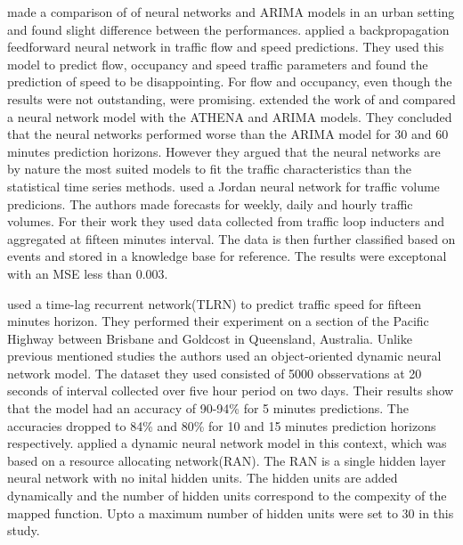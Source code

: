 \citet{clark1993use} made a comparison of of neural networks and ARIMA models in an urban setting
and found slight difference between the performances. \citet{dougherty1997short} applied a
backpropagation feedforward neural network in traffic flow and speed predictions. They used this
model to predict flow, occupancy and speed traffic parameters and found the prediction of speed to
be disappointing. For flow and occupancy, even though the results were not outstanding, were promising.
\citet{kirby1997should} extended the work of \citet{clark1993use} and compared a neural network model
with the ATHENA and ARIMA models. They concluded that the neural networks performed worse than the
ARIMA model for 30 and 60 minutes prediction horizons. However they argued that the neural networks
are by nature the most suited models to fit the traffic characteristics than the statistical time
series methods. \citet{yasdi1999prediction} used a Jordan neural network for traffic volume predicions.
The authors made forecasts for weekly, daily and hourly traffic volumes. For their work they used
data collected from traffic loop inducters and aggregated at fifteen minutes interval. The data is
then further classified based on events and stored in a knowledge base for reference. The results were
exceptonal with an MSE less than 0.003.

\citet{dia2001object} used a time-lag recurrent network(TLRN) to predict traffic speed for fifteen
minutes horizon. They performed their experiment on a section of the Pacific Highway between
Brisbane and Goldcost in Queensland, Australia. Unlike previous mentioned studies the authors used
an object-oriented dynamic neural network model. The dataset they used consisted of 5000
obsservations at 20 seconds of interval collected over five hour period on two days. Their results
show that the model had an accuracy of 90-94\% for 5 minutes predictions. The accuracies dropped
to 84\% and 80\% for 10 and 15 minutes prediction horizons respectively. \citet{chen2001use} applied
a dynamic neural network model in this context, which was based on a resource allocating network(RAN).
The RAN is a single hidden layer neural network with no inital hidden units. The hidden units are added
dynamically and the number of hidden units correspond to the compexity of the mapped function. Upto
a maximum number of hidden units were set to 30 in this study.

